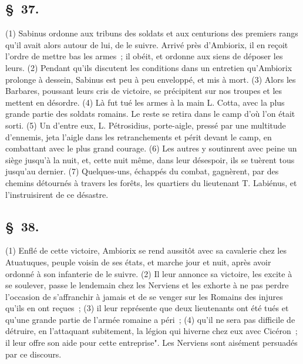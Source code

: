 \documentclass[french,twoside]{book} %
\begin{document}
\subsection[{§ 37.}]{ \textsc{§ 37.} }
\noindent (1) Sabinus ordonne aux tribuns des soldats et aux centurions des premiers rangs qu’il avait alors autour de lui, de le suivre. Arrivé près d’Ambiorix, il en reçoit l’ordre de mettre bas les armes ; il obéit, et ordonne aux siens de déposer les leurs. (2) Pendant qu’ils discutent les conditions dans un entretien qu’Ambiorix prolonge à dessein, Sabinus est peu à peu enveloppé, et mis à mort. (3) Alors les Barbares, poussant leurs cris de victoire, se précipitent sur nos troupes et les mettent en désordre. (4) Là fut tué les armes à la main L. Cotta, avec la plus grande partie des soldats romains. Le reste se retira dans le camp d’où l’on était sorti. (5) Un d’entre eux, L. Pétrosidius, porte-aigle, pressé par une multitude d’ennemis, jeta l’aigle dans les retranchements et périt devant le camp, en combattant avec le plus grand courage. (6) Les autres y soutinrent avec peine un siège jusqu’à la nuit, et, cette nuit même, dans leur désespoir, ils se tuèrent tous jusqu’au dernier. (7) Quelques-uns, échappés du combat, gagnèrent, par des chemins détournés à travers les forêts, les quartiers du lieutenant T. Labiénus, et l’instruisirent de ce désastre.
\subsection[{§ 38.}]{ \textsc{§ 38.} }
\noindent (1) Enflé de cette victoire, Ambiorix se rend aussitôt avec sa cavalerie chez les Atuatuques, peuple voisin de ses états, et marche jour et nuit, après avoir ordonné à son infanterie de le suivre. (2) Il leur annonce sa victoire, les excite à se soulever, passe le lendemain chez les Nerviens et les exhorte à ne pas perdre l’occasion de s’affranchir à jamais et de se venger sur les Romains des injures qu’ils en ont reçues ; (3) il leur représente que deux lieutenants ont été tués et qu’une grande partie de l’armée romaine a péri ; (4) qu’il ne sera pas difficile de détruire, en l’attaquant subitement, la légion qui hiverne chez eux avec Cicéron ; il leur offre son aide pour cette entreprise". Les Nerviens sont aisément persuadés par ce discours.
\end{document}
